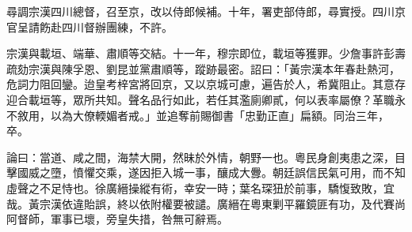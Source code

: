 \begin{pinyinscope}
尋調宗漢四川總督，召至京，改以侍郎候補。十年，署吏部侍郎，尋實授。四川京官呈請飭赴四川督辦團練，不許。

宗漢與載垣、端華、肅順等交結。十一年，穆宗即位，載垣等獲罪。少詹事許彭壽疏劾宗漢與陳孚恩、劉昆並黨肅順等，蹤跡最密。詔曰：「黃宗漢本年春赴熱河，危詞力阻回鑾。迨皇考梓宮將回京，又以京城可慮，遍告於人，希冀阻止。其意存迎合載垣等，眾所共知。聲名品行如此，若任其濫廁卿貳，何以表率屬僚？革職永不敘用，以為大僚輭媚者戒。」並追奪前賜御書「忠勤正直」扁額。同治三年，卒。

論曰：當道、咸之間，海禁大開，然昧於外情，朝野一也。粵民身創夷患之深，目擊國威之墮，憤懼交乘，遂因拒入城一事，釀成大釁。朝廷誤信民氣可用，而不知虛聲之不足恃也。徐廣縉操縱有術，幸安一時；葉名琛狃於前事，驕愎致敗，宜哉。黃宗漢依違貽誤，終以依附權要被譴。廣縉在粵東剿平羅鏡匪有功，及代賽尚阿督師，軍事已壞，旁皇失措，咎無可辭焉。


\end{pinyinscope}